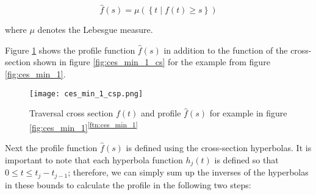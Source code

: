 $$\hat{f}(s) = \mu(\left\{ t \mid f(t) \geq s \right\})$$

where $\mu$ denotes the Lebesgue measure.\cite{rotelex}

Figure \ref{fig:ces_min_1_csp} shows the profile function $\hat{f}(s)$ in addition to the function of the cross-section shown in figure \ref{fig:ces_min_1_cs} for the example from figure \ref{fig:ces_min_1}.

 \begin{figure}[H]
    \centering
    
    \texttt{[image: ces\_min\_1\_csp.png]}
		
	\caption{Traversal cross section $f(t)$ and profile $\hat{f}(s)$ for example in figure \ref{fig:ces_min_1}\textsuperscript{\ref{ftn:ces_min_1}}}
    \label{fig:ces_min_1_csp}
\end{figure}

Next the profile function $\hat{f}(s)$ is defined using the cross-section hyperbolas. It is important to note that each hyperbola function $h_j(t)$ is defined so that $0 \leq t \leq t_j - t_{j-1}$; therefore, we can simply sum up the inverses of the hyperbolas in these bounds to calculate the profile in the following two steps:

